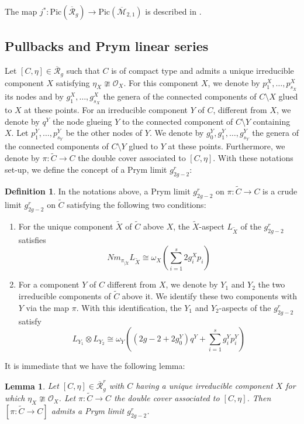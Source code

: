 \documentclass{article}
\theoremstyle{plain}
\newtheorem{lm}[trm]{Lemma}
\theoremstyle{definition}
\newtheorem{defi}[trm]{Definition}
\def\OO{\mathcal{O}}
\def\rr{\overline{\mathcal{R}}}
\def\mm{\overline{\mathcal{M}}}
\begin{document}
The map $j^*\colon \mathrm{Pic}(\rr_g) \rightarrow \mathrm{Pic}(\mm_{2,1})$ is described in \cite[Proposition 6.1]{BudKodPrym}.
\subsection{Pullbacks and Prym linear series}
Let $[C,\eta] \in \rr_g$ such that $C$ is of compact type and admits a unique irreducible component $X$ satisfying $\eta_X \ncong \OO_X$. For this component $X$, we denote by $p^X_1,\ldots, p^X_{s_X}$ its nodes and by $g^X_1,\ldots, g^X_{s_X}$ the genera of the connected components of $C\setminus X$ glued to $X$ at these points.  For an irreducible component $Y$ of $C$, different from $X$, we denote by $q^Y$ the node glueing $Y$ to the connected component of $C\setminus Y$ containing $X$. Let $p^Y_1,\ldots, p_{s_Y}^Y$ be the other nodes of $Y$. We denote by $g^Y_0, g^Y_1,\ldots, g^Y_{s_Y}$ the genera of the connected components of $C\setminus Y$ glued to $Y$ at these points. Furthermore, we denote by $\pi\colon\widetilde{C}\rightarrow C$ the double cover associated to $[C,\eta]$. With these notations set-up, we define the concept of a Prym limit $g^r_{2g-2}$: 
\begin{defi}
	In the notations above, a Prym limit $g^r_{2g-2}$ on $\pi\colon \widetilde{C}\rightarrow C$ is a crude limit $g^r_{2g-2}$ on $\widetilde{C}$ satisfying the following two conditions: 
	\begin{enumerate}
		\item For the unique component $\widetilde{X}$ of $\widetilde{C}$ above $X$, the $\widetilde{X}$-aspect $L_{\widetilde{X}}$ of the $g^r_{2g-2}$ satisfies
		\[Nm_{\pi_{|\widetilde{X}}} L_{\widetilde{X}} \cong \omega_X(\sum_{i=1}^s2g^X_ip_i)\]
		\item For a component $Y$ of $C$ different from $X$, we denote by $Y_1$ and $Y_2$ the two irreducible components of $\widetilde{C}$ above it. We identify these two components with $Y$ via the map $\pi$. With this identification, the $Y_1$ and $Y_2$-aspects of the $g^r_{2g-2}$ satisfy 
		\[ L_{Y_1}\otimes L_{Y_2} \cong \omega_Y((2g-2+2g^Y_0)q^Y + \sum_{i=1}^sg_i^Yp_i^Y) \]
	\end{enumerate} 
	
\end{defi}

It is immediate that we have the following lemma: 
\begin{lm}
	Let $[C,\eta]\in \rr^r_g$ with $C$ having a unique irreducible component $X$ for which $\eta_X \ncong \OO_X$. Let $\pi\colon\widetilde{C}\rightarrow C$ the double cover associated to $[C,\eta]$. Then $[\pi\colon \widetilde{C}\rightarrow C]$ admits a Prym limit $g^r_{2g-2}$. 
\end{lm}
\end{document}
